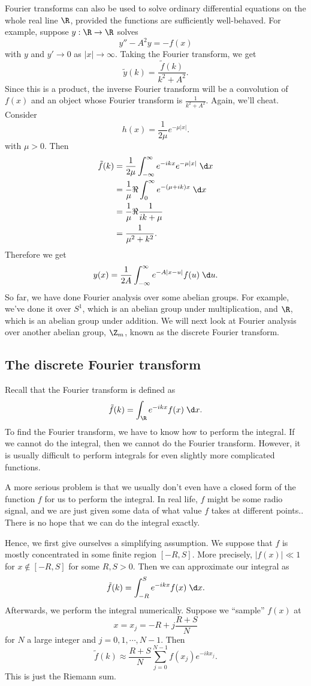 \documentclass[a4paper]{article}
\begin{document}
Fourier transforms can also be used to solve ordinary differential equations on the whole real line $\R$, provided the functions are sufficiently well-behaved. For example, suppose $y: \R \to \R$ solves
\[
  y'' - A^2 y = -f(x)
\]
with $y$ and $y' \to 0$ as $|x| \to \infty$. Taking the Fourier transform, we get
\[
  \tilde{y}(k) = \frac{\tilde{f}(k)}{k^2 + A^2}.
\]
Since this is a product, the inverse Fourier transform will be a convolution of $f(x)$ and an object whose Fourier transform is $\frac{1}{k^2 + A^2}$. Again, we'll cheat. Consider
\[
  h(x) = \frac{1}{2\mu} e^{-\mu|x|}.
\]
with $\mu > 0$. Then
\begin{align*}
  \tilde{f}(k) &= \frac{1}{2\mu} \int_{-\infty}^\infty e^{-ikx} e^{-\mu |x|}\;\d x\\
  &= \frac{1}{\mu} \Re \int_0^\infty e^{-(\mu + ik)x}\;\d x \\
  &= \frac{1}{\mu} \Re \frac{1}{ik + \mu} \\
  &= \frac{1}{\mu^2 + k^2}.
\end{align*}
Therefore we get
\[
  y(x) = \frac{1}{2A} \int_{-\infty}^\infty e^{-A|x - u|} f(u)\;\d u.
\]
So far, we have done Fourier analysis over some abelian groups. For example, we've done it over $S^1$, which is an abelian group under multiplication, and $\R$, which is an abelian group under addition. We will next look at Fourier analysis over another abelian group, $\Z_m$, known as the discrete Fourier transform.

\subsection{The discrete Fourier transform}
Recall that the Fourier transform is defined as
\[
  \tilde{f}(k) = \int_\R e^{-ikx} f(x)\;\d x.
\]
To find the Fourier transform, we have to know how to perform the integral. If we cannot do the integral, then we cannot do the Fourier transform. However, it is usually difficult to perform integrals for even slightly more complicated functions.

A more serious problem is that we usually don't even have a closed form of the function $f$ for us to perform the integral. In real life, $f$ might be some radio signal, and we are just given some data of what value $f$ takes at different points.. There is no hope that we can do the integral exactly.

Hence, we first give ourselves a simplifying assumption. We suppose that $f$ is mostly concentrated in some finite region $[-R, S]$. More precisely, $|f(x)|\ll 1$ for $x \not\in [-R, S]$ for some $R, S > 0$. Then we can approximate our integral as
\[
  \tilde{f}(k) = \int_{-R}^S e^{-ikx} f(x)\;\d x.
\]
Afterwards, we perform the integral numerically. Suppose we ``sample'' $f(x)$ at
\[
  x = x_j = -R + j\frac{R + S}{N}
\]
for $N$ a large integer and $j = 0, 1, \cdots, N - 1$. Then
\[
  \tilde{f}(k) \approx \frac{R + S}{N} \sum_{j = 0}^{N - 1} f(x_j) e^{-ik x_j}.
\]
This is just the Riemann sum.
\end{document}
